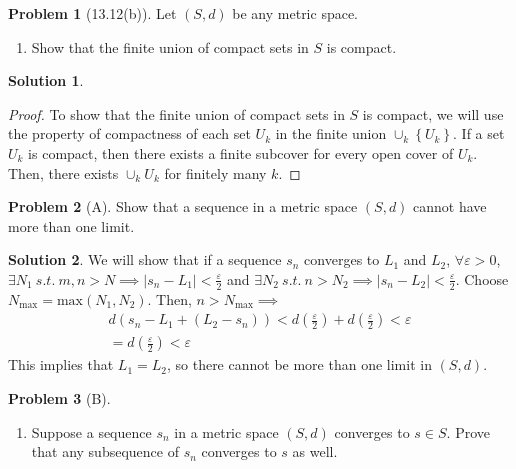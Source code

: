 \documentclass[12pt]{article}
\theoremstyle{definition} %
\newtheorem{solution}{Solution}
\newtheorem{problem}{Problem}
\theoremstyle{plain} %
\begin{document}
\begin{problem}[13.12(b)]   
Let \((S,d)\) be any metric space.
\begin{enumerate}
    \item Show that the finite union of compact sets in \(S\) is compact.
\end{enumerate}
\end{problem}

\begin{solution}
   \begin{proof}
    To show that the finite union of compact sets in \(S\) is compact, we will use the property of compactness of each set \(U_k\) in the finite union \(\cup_k \left\{  U_k\right\} \). 
    If a set \(U_k\) is compact, then there exists a finite subcover for every open cover of \(U_k\). Then, there exists \(\cup_k U_k\) for finitely many \(k\).
   \end{proof} 
\end{solution}

\begin{problem}[A]
    Show that a sequence in a metric space \((S,d)\) cannot have more than one limit.
\end{problem}

\begin{solution}
   We will show that if a sequence \(s_{n} \) converges to \(L_{1} \) and \(L_{2} \), \(\forall \varepsilon >0\), \(\exists N_{1}\ s.t. \ m,n >N \implies \left\vert s_{n} -L_{1}   \right\vert <\frac{\varepsilon}{2}\) and \(\exists N_{2} \ s.t. \ n>N_{2} \implies \left\vert s_{n} -L_{2}  \right\vert <\frac{\varepsilon}{2}\). Choose \(N_{\text{max} }=\text{max}(N_{1},N_{2} )  \). Then, \(n>N_{\text{max} } \implies \)
   \begin{align}
    d\left( s_{n}  -L_{1}  + (L_{2}-s_{n}) \right)  <  d\left( \frac{\varepsilon}{2} \right)  +  d\left( \frac{\varepsilon}{2} \right)< \varepsilon \\[10pt] 
   =  d\left( \frac{\varepsilon}{2} \right) <\varepsilon 
   \end{align}
   This implies that \(L_{1} =L_{2} \), so there cannot be more than one limit in \((S,d)\). 
\end{solution}

\begin{problem}[B]
    \begin{enumerate}
        \item Suppose a sequence \(s_{n} \) in a metric space \((S,d)\) converges to \(s\in S\). Prove that any subsequence of \(s_{n} \) converges to \(s\) as well.
    \end{enumerate}
\end{problem}
\end{document}
